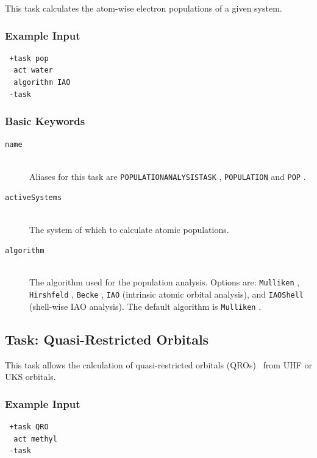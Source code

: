 \documentclass[bibliography=totocnumbered,a4paper,10pt,oneside]{scrbook}
\newcommand{\ttt}[1]{%
  \begingroup\setlength{\fboxsep}{1pt}%
  \colorbox{serenity-green!30}{\texttt{\hspace*{2pt}\vphantom{(g}#1\hspace*{2pt}}}%
  \endgroup
}
\begin{document}
This task calculates the atom-wise electron populations of a given system.
\subsubsection{Example Input}
\begin{lstlisting}
 +task pop
  act water
  algorithm IAO
 -task
\end{lstlisting}

\subsubsection{Basic Keywords}
\begin{description}
 \item [\texttt{name}]\hfill \\
  Aliases for this task are \ttt{POPULATIONANALYSISTASK}, \ttt{POPULATION} and \ttt{POP}.
 \item [\texttt{activeSystems}]\hfill \\
  The system of which to calculate atomic populations.
 \item [\texttt{algorithm}]\hfill \\
  The algorithm used for the population analysis.
  Options are: \ttt{Mulliken}, \ttt{Hirshfeld}, \ttt{Becke}, \ttt{IAO} (intrinsic atomic orbital analysis),
  and \ttt{IAOShell} (shell-wise IAO analysis). The default algorithm is \ttt{Mulliken}.
\end{description}

\subsection{Task: Quasi-Restricted Orbitals}

This task allows the calculation of quasi-restricted orbitals (QROs)~\cite{Neese2006} from UHF or UKS orbitals.
\subsubsection{Example Input}
\begin{lstlisting}
 +task QRO
  act methyl
 -task
\end{lstlisting}
\end{document}

